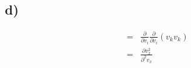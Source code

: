 \documentclass[paper=a4, fontsize=12pt]{scrartcl}
\begin{document}
\subsection*{d)}
\begin{align*}
=&
\frac{\partial}{\partial v_i} \frac{\partial}{\partial v_i}(v_k v_k)\\
=& \frac{\partial v^2_x}{\partial ^2 v_x}
\end{align*}	


	
	
\end{document}
